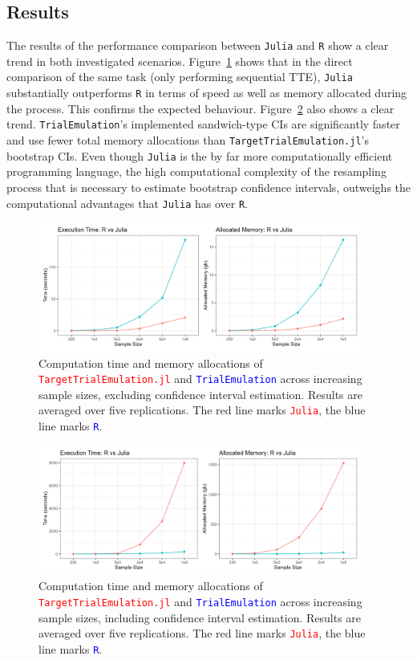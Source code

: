 \documentclass[pdflatex,sn-vancouver-ay]{sn-jnl}%
\theoremstyle{thmstyleone}%
\theoremstyle{thmstyletwo}%
\theoremstyle{thmstylethree}%
\newcommand{\Rlang}{\texttt{R}}
\newcommand{\julia}{\texttt{Julia}}
\newcommand{\RTTE}{\texttt{TrialEmulation}}
\newcommand{\juliaTTE}{\texttt{TargetTrialEmulation.jl}}
\begin{document}
\begin{appendices}
\subsection{Results}
The results of the performance comparison between \julia{} and \Rlang{} show a clear trend in both investigated scenarios. Figure~\ref{plt:speed_noCI} shows that in the direct comparison of the same task (only performing sequential TTE), \julia{} substantially outperforms \Rlang{} in terms of speed as well as memory allocated during the process. This confirms the expected behaviour. Figure~\ref{plt:speed_CI} also shows a clear trend. \RTTE{}'s implemented sandwich-type CIs are significantly faster and use fewer total memory allocations than \juliaTTE{}'s bootstrap CIs. Even though \julia{} is the by far more computationally efficient programming language, the high computational complexity of the resampling process that is necessary to estimate bootstrap confidence intervals, outweighs the computational advantages that \julia{} has over \Rlang{}.

\begin{figure}[h]
\centering
\includegraphics[width=0.95\textwidth]{plots_performance/noCI_performance.png}
\caption{Computation time and memory allocations of \textcolor{red}{\juliaTTE{}} and \textcolor{blue}{\RTTE{}} across increasing sample sizes, excluding confidence interval estimation. Results are averaged over five replications. The red line marks \textcolor{red}{\julia{}}, the blue line marks \textcolor{blue}{\Rlang{}}.}
\label{plt:speed_noCI}
\end{figure}

\begin{figure}[h]
\centering
\includegraphics[width=0.95\textwidth]{plots_performance/CI_performance.png}
\caption{Computation time and memory allocations of \textcolor{red}{\juliaTTE{}} and \textcolor{blue}{\RTTE{}} across increasing sample sizes, including confidence interval estimation. Results are averaged over five replications. The red line marks \textcolor{red}{\julia{}}, the blue line marks \textcolor{blue}{\Rlang{}}.}
\label{plt:speed_CI}
\end{figure}



\end{appendices}
\end{document}
